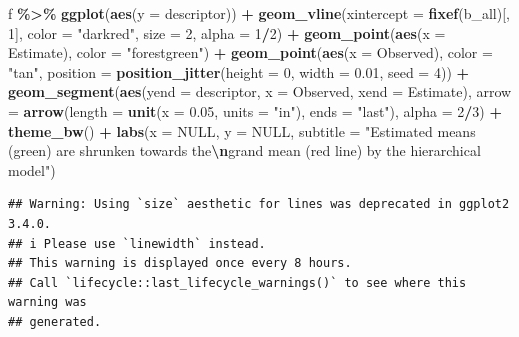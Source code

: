 \documentclass[
]{book}
\newenvironment{Shaded}{\begin{snugshade}}{\end{snugshade}}
\newcommand{\AttributeTok}[1]{\textcolor[rgb]{0.13,0.29,0.53}{#1}}
\newcommand{\ConstantTok}[1]{\textcolor[rgb]{0.56,0.35,0.01}{#1}}
\newcommand{\DecValTok}[1]{\textcolor[rgb]{0.00,0.00,0.81}{#1}}
\newcommand{\FloatTok}[1]{\textcolor[rgb]{0.00,0.00,0.81}{#1}}
\newcommand{\FunctionTok}[1]{\textcolor[rgb]{0.13,0.29,0.53}{\textbf{#1}}}
\newcommand{\NormalTok}[1]{#1}
\newcommand{\SpecialCharTok}[1]{\textcolor[rgb]{0.81,0.36,0.00}{\textbf{#1}}}
\newcommand{\StringTok}[1]{\textcolor[rgb]{0.31,0.60,0.02}{#1}}
\begin{document}
\begin{Shaded}
\begin{Highlighting}[]
\NormalTok{f }\SpecialCharTok{\%\textgreater{}\%}
  \FunctionTok{ggplot}\NormalTok{(}\FunctionTok{aes}\NormalTok{(}\AttributeTok{y =}\NormalTok{ descriptor)) }\SpecialCharTok{+}
  \FunctionTok{geom\_vline}\NormalTok{(}\AttributeTok{xintercept =} \FunctionTok{fixef}\NormalTok{(b\_all)[, }\DecValTok{1}\NormalTok{], }
             \AttributeTok{color =} \StringTok{"darkred"}\NormalTok{, }\AttributeTok{size =} \DecValTok{2}\NormalTok{, }\AttributeTok{alpha =} \DecValTok{1}\SpecialCharTok{/}\DecValTok{2}\NormalTok{) }\SpecialCharTok{+} 
  \FunctionTok{geom\_point}\NormalTok{(}\FunctionTok{aes}\NormalTok{(}\AttributeTok{x =}\NormalTok{ Estimate), }\AttributeTok{color =} \StringTok{"forestgreen"}\NormalTok{) }\SpecialCharTok{+}
  \FunctionTok{geom\_point}\NormalTok{(}\FunctionTok{aes}\NormalTok{(}\AttributeTok{x =}\NormalTok{ Observed), }\AttributeTok{color =} \StringTok{"tan"}\NormalTok{, }
             \AttributeTok{position =} \FunctionTok{position\_jitter}\NormalTok{(}\AttributeTok{height =} \DecValTok{0}\NormalTok{, }\AttributeTok{width =} \FloatTok{0.01}\NormalTok{, }\AttributeTok{seed =} \DecValTok{4}\NormalTok{)) }\SpecialCharTok{+}
  \FunctionTok{geom\_segment}\NormalTok{(}\FunctionTok{aes}\NormalTok{(}\AttributeTok{yend =}\NormalTok{ descriptor, }\AttributeTok{x =}\NormalTok{ Observed, }\AttributeTok{xend =}\NormalTok{ Estimate), }
               \AttributeTok{arrow =} \FunctionTok{arrow}\NormalTok{(}\AttributeTok{length =} \FunctionTok{unit}\NormalTok{(}\AttributeTok{x =} \FloatTok{0.05}\NormalTok{, }\AttributeTok{units =} \StringTok{"in"}\NormalTok{), }\AttributeTok{ends =} \StringTok{"last"}\NormalTok{),}
               \AttributeTok{alpha =} \DecValTok{2}\SpecialCharTok{/}\DecValTok{3}\NormalTok{) }\SpecialCharTok{+} 
  \FunctionTok{theme\_bw}\NormalTok{() }\SpecialCharTok{+} 
  \FunctionTok{labs}\NormalTok{(}\AttributeTok{x =} \ConstantTok{NULL}\NormalTok{, }\AttributeTok{y =} \ConstantTok{NULL}\NormalTok{,}
       \AttributeTok{subtitle =} \StringTok{"Estimated means (green) are shrunken towards the}\SpecialCharTok{\textbackslash{}n}\StringTok{grand mean (red line) by the hierarchical model"}\NormalTok{)}
\end{Highlighting}
\end{Shaded}

\begin{verbatim}
## Warning: Using `size` aesthetic for lines was deprecated in ggplot2 3.4.0.
## i Please use `linewidth` instead.
## This warning is displayed once every 8 hours.
## Call `lifecycle::last_lifecycle_warnings()` to see where this warning was
## generated.
\end{verbatim}
\end{document}
